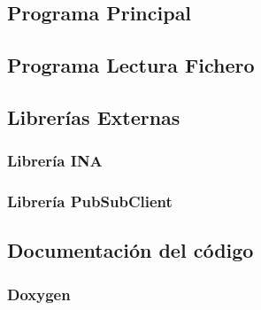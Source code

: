 \subsection{Programa Principal}


\subsection{Programa Lectura Fichero}


\subsection{Librerías Externas}
\subsubsection{Librería INA}


\subsubsection{Librería PubSubClient}


\subsection{Documentación del código}
\subsubsection{Doxygen}

